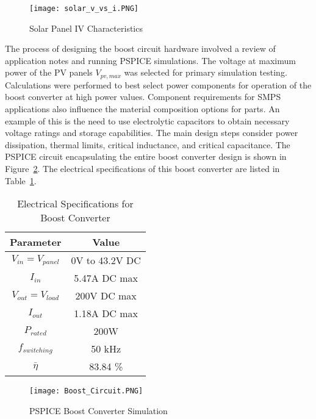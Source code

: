 \begin{figure}
\centering
\texttt{[image: solar\_v\_vs\_i.PNG]}
\caption{Solar Panel IV Characteristics\cite{SharpPanel}}
\label{panelCharacteristics}
\end{figure}

The process of designing the boost circuit hardware involved a review of application notes and running PSPICE simulations. The voltage at maximum power of the PV panels $V_{pv,max}$ was selected for primary simulation testing. Calculations were performed to best select power components for operation of the boost converter at high power values. Component requirements for SMPS applications also influence the material composition options for parts. An example of this is the need to use electrolytic capacitors to obtain necessary voltage ratings and storage capabilities. The main design steps consider power dissipation, thermal limits, critical inductance, and critical capacitance. The PSPICE circuit encapsulating the entire boost converter design is shown in Figure~\ref{boostCrct}. The electrical specifications of this boost converter are listed in Table~\ref{specsBoost}.
\\ 
\begin{table}
\centering
\begin{tabular}{|c|c|}
\hline
 Parameter & Value \\
 \hline
 $ V_{in} = V_{panel}$ & 0V to 43.2V DC \\
 \hline
 $ I_{in}$ & 5.47A DC max \\
 \hline
 $ V_{out}=V_{load} $ & 200V DC max \\
 \hline
 $ I_{out} $ & 1.18A DC max \\
 \hline
 $ P_{rated} $ & 200W \\
 \hline
 $ f_{switching} $ & 50 kHz \\
 \hline
 $\bar{\eta} $ & 83.84 \% \\
 \hline
\end{tabular}
\caption{Electrical Specifications for Boost Converter}
\label{specsBoost}
\end{table}

\begin{figure}
\centering
\texttt{[image: Boost\_Circuit.PNG]}
\caption{PSPICE Boost Converter Simulation}
\label{boostCrct}
\end{figure}

